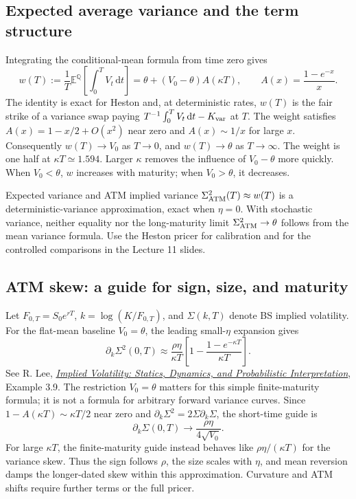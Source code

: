 \documentclass[10pt]{article}
\newcommand{\E}{\mathbb E}\newcommand{\Q}{\mathbb Q}\newcommand{\cF}{\mathcal F}
\newcommand{\dd}{\,\mathrm d}\newcommand{\Pp}{\mathbb P}\newcommand{\Var}{\operatorname{Var}}\newcommand{\Cov}{\operatorname{Cov}}
\theoremstyle{definition}\newtheorem{definition}{Definition}[section]
\begin{document}
\subsection{Expected average variance and the term structure}\label{sec:term}
Integrating the conditional-mean formula from time zero gives
\[
\boxed{w(T):=\frac1T\E^\Q\!\left[\int_0^T V_t\dd t\right]
=\theta+(V_0-\theta)A(\kappa T),\qquad
A(x)=\frac{1-e^{-x}}x.}
\]
The identity is exact for Heston and, at deterministic rates, \(w(T)\)
is the fair strike of a variance swap paying
\(T^{-1}\int_0^T V_t\dd t-K_{\rm var}\) at \(T\). The weight satisfies
\(A(x)=1-x/2+O(x^2)\) near zero and \(A(x)\sim1/x\) for large \(x\).
Consequently \(w(T)\to V_0\) as \(T\to0\), and \(w(T)\to\theta\) as
\(T\to\infty\). The weight is one half at \(\kappa T\simeq1.594\).
Larger \(\kappa\) removes the influence of \(V_0-\theta\) more quickly.
When \(V_0<\theta\), \(w\) increases with maturity; when \(V_0>\theta\),
it decreases.

\begin{warningbox}{Expected variance and ATM implied variance}
\(\Sigma_{\rm ATM}^2(T)\approx w(T)\) is a deterministic-variance approximation,
exact when \(\eta=0\). With stochastic variance, neither equality nor the
long-maturity limit \(\Sigma_{\rm ATM}^2\to\theta\) follows from the mean
variance formula. Use the Heston pricer for calibration and for the
controlled comparisons in the Lecture 11 slides.
\end{warningbox}


\subsection{ATM skew: a guide for sign, size, and maturity}\label{sec:skew}
Let \(F_{0,T}=S_0e^{rT}\), \(k=\log(K/F_{0,T})\), and \(\Sigma(k,T)\)
denote BS implied volatility. For the flat-mean baseline \(V_0=\theta\),
the leading small-\(\eta\) expansion gives
\[
\boxed{\partial_k\Sigma^2(0,T)\approx
\frac{\rho\eta}{\kappa T}
\left[1-\frac{1-e^{-\kappa T}}{\kappa T}\right].}
\]
See R. Lee, \href{https://math.uchicago.edu/~rogerlee/impvol.pdf}
{\emph{Implied Volatility: Statics, Dynamics, and Probabilistic Interpretation}},
Example 3.9. The restriction \(V_0=\theta\) matters for this simple finite-maturity
formula; it is not a formula for arbitrary forward variance curves.
Since \(1-A(\kappa T)\sim\kappa T/2\) near zero and
\(\partial_k\Sigma^2=2\Sigma\partial_k\Sigma\), the short-time guide is
\[
\partial_k\Sigma(0,T)\longrightarrow\frac{\rho\eta}{4\sqrt{V_0}}.
\]
For large \(\kappa T\), the finite-maturity guide instead behaves like
\(\rho\eta/(\kappa T)\) for the variance skew. Thus the sign follows
\(\rho\), the size scales with \(\eta\), and mean reversion damps the
longer-dated skew within this approximation. Curvature and ATM shifts
require further terms or the full pricer.
\end{document}
